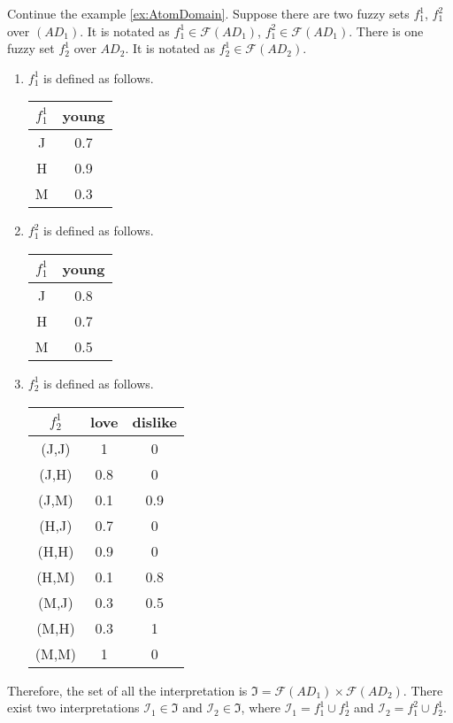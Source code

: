 \documentclass[Thesis.tex]{subfiles}
\begin{document}
\begin{ex}
Continue the example \ref{ex:AtomDomain}. Suppose there are two fuzzy sets $f_1^1$, $f_1^2$ over $(AD_1)$. It is notated as $f_1^1 \in \mathcal{F}(AD_1)$, $f_1^2 \in \mathcal{F}(AD_1)$.  There is one fuzzy set $f_2^1$ over $AD_2$. It is notated as $f_2^1 \in \mathcal{F}(AD_2)$. 

\begin{enumerate}

\item $f_1^1$ is defined as follows. \\

\begin{tabular}{|c|c|}
\hline
$f_1^1$ & young \\
\hline
J & 0.7 \\
\hline
H & 0.9 \\
\hline
M & 0.3 \\
\hline
\end{tabular}

\item $f_1^2$ is defined as follows. \\

\begin{tabular}{|c|c|}
\hline
$f_1^1$ & young \\
\hline
J & 0.8 \\
\hline
H & 0.7 \\
\hline
M & 0.5 \\
\hline
\end{tabular}

\item $f_2^1$ is defined as follows. \\

\begin{tabular}{|c|c|c|}
\hline
$f_2^1$ & love & dislike \\
\hline
(J,J) & 1 & 0\\
\hline
(J,H) & 0.8 & 0\\
\hline
(J,M) & 0.1 & 0.9\\
\hline
(H,J) & 0.7 & 0\\
\hline
(H,H) & 0.9 & 0\\
\hline
(H,M) & 0.1 & 0.8\\
\hline
(M,J) & 0.3 & 0.5\\
\hline
(M,H) & 0.3 & 1\\
\hline
(M,M) & 1 & 0\\
\hline


\end{tabular}

\end{enumerate}

\noindent
Therefore, the set of all the interpretation is $\mathfrak{I}=\mathcal{F}(AD_1) \times \mathcal{F}(AD_2)$. There exist two interpretations $\mathcal{I}_1 \in \mathfrak{I}$ and $\mathcal{I}_2 \in \mathfrak{I}$, where $\mathcal{I}_1=f_1^1 \cup f_2^1$ and $\mathcal{I}_2=f_1^2 \cup f_2^1$.
\end{ex}
\end{document}
